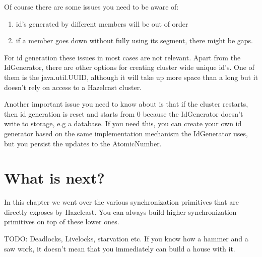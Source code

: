 Of course there are some issues you need to be aware of:
\begin{enumerate}
\item id's generated by different members will be out of order
\item if a member goes down without fully using its segment, there might be gaps.
\end{enumerate}
For id generation these issues in most cases are not relevant. Apart from the IdGenerator, there are other options for creating cluster wide unique id's. One of them is the java.util.UUID, although it will take up more space than a long but it doesn't rely on access to a Hazelcast cluster.

Another important issue you need to know about is that if the cluster restarts, then id generation is reset and starts from 0 because the IdGenerator doesn't write to storage, e.g a database. If you need this, you can create your own id generator based on the same implementation mechanism the IdGenerator uses, but you persist the updates to the AtomicNumber.

\section{What is next?}
In this chapter we went over the various synchronization primitives that are directly exposes by Hazelcast. You can always build higher synchronization primitives on top of these lower ones.

TODO: Deadlocks, Livelocks, starvation etc. If you know how a hammer and a saw work, it doesn't mean that you immediately can build a house with it.
